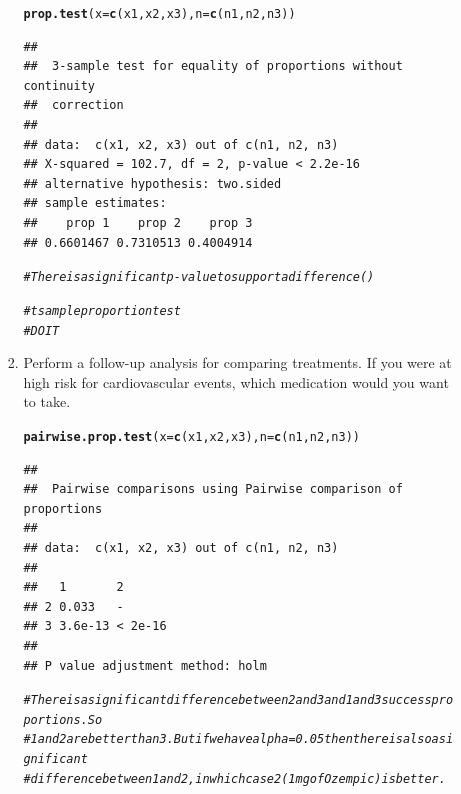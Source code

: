 \documentclass{article}\usepackage[]{graphicx}\usepackage[]{color}
\makeatletter
\newcommand{\hlcom}[1]{\textcolor[rgb]{0.678,0.584,0.686}{\textit{#1}}}%
\newcommand{\hlstd}[1]{\textcolor[rgb]{0.345,0.345,0.345}{#1}}%
\newcommand{\hlkwc}[1]{\textcolor[rgb]{0.333,0.667,0.333}{#1}}%
\newcommand{\hlkwd}[1]{\textcolor[rgb]{0.737,0.353,0.396}{\textbf{#1}}}%
\newenvironment{kframe}{%
 \def\at@end@of@kframe{}%
 \ifinner\ifhmode%
  \def\at@end@of@kframe{\end{minipage}}%
  \begin{minipage}{\columnwidth}%
 \fi\fi%
 \def\FrameCommand##1{\hskip\@totalleftmargin \hskip-\fboxsep
 \colorbox{shadecolor}{##1}\hskip-\fboxsep
     \hskip-\linewidth \hskip-\@totalleftmargin \hskip\columnwidth}%
 \MakeFramed {\advance\hsize-\width
   \@totalleftmargin\z@ \linewidth\hsize
   \@setminipage}}%
 {\par\unskip\endMakeFramed%
 \at@end@of@kframe}
\newenvironment{knitrout}{}{} %
\makeatother
\begin{document}
\begin{enumerate}
\begin{enumerate}
\begin{enumerate}
\begin{knitrout}
\begin{kframe}
\begin{alltt}
\hlkwd{prop.test}\hlstd{(}\hlkwc{x} \hlstd{=} \hlkwd{c}\hlstd{(x1, x2, x3),} \hlkwc{n} \hlstd{=} \hlkwd{c}\hlstd{(n1, n2, n3))}
\end{alltt}
\begin{verbatim}
## 
## 	3-sample test for equality of proportions without continuity
## 	correction
## 
## data:  c(x1, x2, x3) out of c(n1, n2, n3)
## X-squared = 102.7, df = 2, p-value < 2.2e-16
## alternative hypothesis: two.sided
## sample estimates:
##    prop 1    prop 2    prop 3 
## 0.6601467 0.7310513 0.4004914
\end{verbatim}
\begin{alltt}
\hlcom{# There is a significant p-value to support a difference ()}


\hlcom{#t sample proportion test}
\hlcom{#DO IT}
\end{alltt}
\end{kframe}
\end{knitrout}
  \item Perform a follow-up analysis for comparing treatments. If you were at high risk for 
  cardiovascular events, which medication would you want to take.
\begin{knitrout}
\color{fgcolor}\begin{kframe}
\begin{alltt}
\hlkwd{pairwise.prop.test}\hlstd{(}\hlkwc{x} \hlstd{=} \hlkwd{c}\hlstd{(x1, x2, x3),} \hlkwc{n} \hlstd{=} \hlkwd{c}\hlstd{(n1, n2, n3))}
\end{alltt}
\begin{verbatim}
## 
## 	Pairwise comparisons using Pairwise comparison of proportions 
## 
## data:  c(x1, x2, x3) out of c(n1, n2, n3) 
## 
##   1       2      
## 2 0.033   -      
## 3 3.6e-13 < 2e-16
## 
## P value adjustment method: holm
\end{verbatim}
\begin{alltt}
\hlcom{# There is a significant difference between 2 and 3 and 1 and 3 success proportions. So}
\hlcom{# 1 and 2 are better than 3. But if we have alpha = 0.05 then there is also a significant }
\hlcom{# difference between 1 and 2, in which case 2 (1 mg of Ozempic) is better.}
\end{alltt}
\end{kframe}
\end{knitrout}



\end{enumerate}
\end{enumerate}
\end{enumerate}
\end{document}
